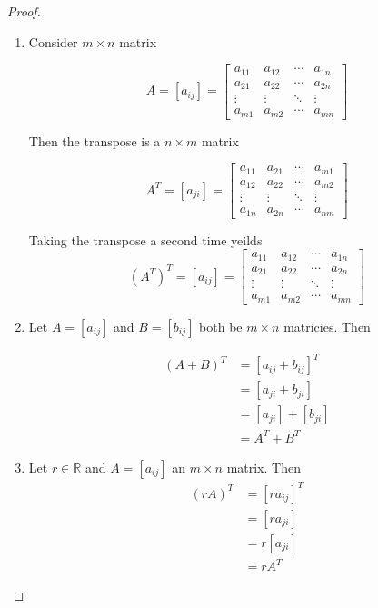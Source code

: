 \begin{proof}
\begin{enumerate}

\item Consider $m \times n$ matrix  

$$A=[a_{ij}]=
\begin{bmatrix}
a_{11} & a_{12} & \cdots & a_{1n} \\
a_{21} & a_{22} & \cdots & a_{2n} \\
\vdots & \vdots & \ddots & \vdots \\
a_{m1} & a_{m2} & \cdots & a_{mn}
\end{bmatrix}
$$                                 

Then the transpose is a $n \times m$ matrix

$$A^T=[a_{ji}]=
\begin{bmatrix}
a_{11} & a_{21} & \cdots & a_{m1} \\
a_{12} & a_{22} & \cdots & a_{m2} \\
\vdots & \vdots & \ddots & \vdots \\
a_{1n} & a_{2n} & \cdots & a_{nm}
\end{bmatrix}$$    

Taking the transpose a second time yeilds 
$$(A^T)^T=[a_{ij}]=
\begin{bmatrix}
a_{11} & a_{12} & \cdots & a_{1n} \\
a_{21} & a_{22} & \cdots & a_{2n} \\
\vdots & \vdots & \ddots & \vdots \\
a_{m1} & a_{m2} & \cdots & a_{mn}
\end{bmatrix}
$$                                 


\item 
Let $A=[a_{ij}]$ and $B=[b_{ij}]$ both be $m \times n$ matricies. Then 

\begin{align*}
(A+B)^T &= [a_{ij}+b_{ij}]^T \\
              &= [a_{ji}+b_{ji}] \\
              &= [a_{ji}]+[b_{ji}]\\
              &= A^T+B^T 
\end{align*}

\item Let $r \in \mathbb{R}$ and $A=[a_{ij}]$ an $m \times n$ matrix. Then 
\begin{align*}
(rA)^T&=[ra_{ij}]^T\\
&=[ra_{ji}]\\
&=r[a_{ji}]\\
&=rA^T
\end{align*}


\end{enumerate}
\end{proof}
